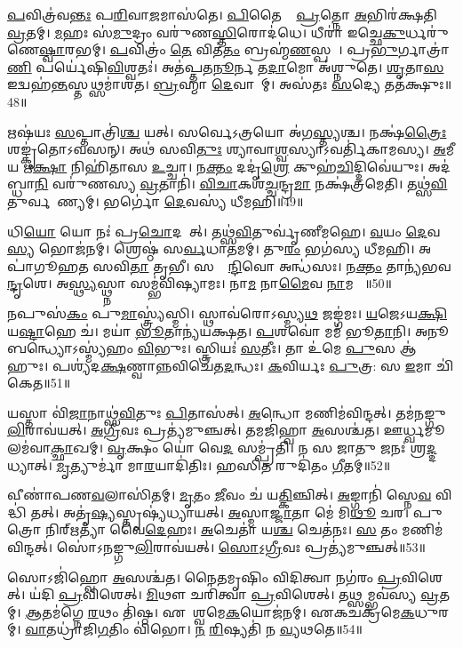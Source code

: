 \ul{𑌪}𑌵𑌿𑌤𑍍𑌰॑𑌵\ul{𑌨𑍍𑌤𑌃} 𑌪\ul{𑌰𑌿}𑌵𑌾\ul{𑌜}𑌮𑌾𑌸॑𑌤𑍇। \ul{𑌪𑌿}𑌤𑍈𑌷𑌾𑌂᳚ \ul{𑌪𑍍𑌰}𑌤𑍍𑌨𑍋 \ul{𑌅}𑌭𑌿𑌰॑𑌕𑍍𑌷𑌤𑌿 \ul{𑌵𑍍𑌰}𑌤𑌮𑍍‌। 
\ul{𑌮}𑌹𑌃 𑌸॑\ul{𑌮𑍁}𑌦𑍍𑌰𑌂 𑌵𑌰𑍁॑𑌣\ul{𑌸𑍍𑌤𑌿}𑌰𑍋𑌦॑𑌧𑍇। 𑌧𑍀𑌰𑌾॑ 𑌇𑌚𑍍𑌛𑍇\ul{𑌕𑍁}𑌰𑍍𑌧𑌰𑍁॑𑌣𑍇\ul{𑌷𑍍𑌵𑌾}𑌰𑌭𑌮𑍍‌᳚। 
\ul{𑌪}𑌵𑌿𑌤𑍍𑌰𑌂॑ \ul{𑌤𑍇} 𑌵𑌿𑌤॑\ul{𑌤𑌂} 𑌬𑍍𑌰𑌹𑍍𑌮॑\ul{𑌣}𑌸𑍍𑌪𑌤𑍇᳚। 𑌪𑍍𑌰\ul{𑌭𑍁}𑌰𑍍𑌗𑌾𑌤𑍍𑌰𑌾॑\ul{𑌣𑌿} 𑌪𑌰𑍍𑌯𑍇॑𑌷𑌿\ul{𑌵𑌿}𑌶𑍍𑌵𑌤𑌃॑। 
𑌅𑌤॑𑌪𑍍𑌤𑌤\ul{𑌨𑍂}𑌰𑍍𑌨 𑌤\ul{𑌦𑌾}𑌮𑍋 𑌅॑𑌶𑍍𑌨𑍁𑌤𑍇। \ul{𑌶𑍃}𑌤𑌾\ul{𑌸} 𑌇𑌦𑍍𑌵𑌹॑\ul{𑌨𑍍𑌤}𑌸𑍍𑌤𑌥𑍍𑌸𑌮𑌾॑𑌶𑌤। 
\ul{𑌬𑍍𑌰}𑌹𑍍𑌮𑌾 \ul{𑌦𑍇}𑌵𑌾𑌨𑌾᳚𑌮𑍍‌। 𑌅𑌸॑𑌤𑌃 \ul{𑌸}𑌦𑍍𑌯𑍇 𑌤𑌤॑𑌕𑍍𑌷𑍁𑌃॥48॥


𑌋𑌷॑𑌯𑌃 \ul{𑌸}𑌪𑍍𑌤𑌾𑌤𑍍𑌰𑌿॑\ul{𑌶𑍍𑌚} 𑌯𑌤𑍍‌। 𑌸𑌰𑍍𑌵𑍇𑌽𑌤𑍍𑌰𑌯𑍋 𑌅॑𑌗\ul{𑌸𑍍𑌤𑍍𑌯}𑌶𑍍𑌚। 
𑌨𑌕𑍍𑌷॑\ul{𑌤𑍍𑌰𑍈𑌃} 𑌶𑌙𑍍𑌕𑍃॑𑌤𑍋𑌽𑌵𑌸𑌨𑍍‌। 𑌅𑌥॑ 𑌸𑌵𑌿\ul{𑌤𑍁𑌃} 𑌶𑍍𑌯𑌾𑌵𑌾\ul{𑌶𑍍𑌵}𑌸𑍍𑌯𑌾𑌽𑌵𑌰𑍍𑌤𑌿॑𑌕𑌾𑌮𑌸𑍍𑌯। 
\ul{𑌅}𑌮𑍀 𑌯 𑌋\ul{𑌕𑍍𑌷𑌾} 𑌨𑌿𑌹𑌿॑𑌤𑌾𑌸 \ul{𑌉}𑌚𑍍𑌚𑌾। 𑌨\ul{𑌕𑍍𑌤𑌂} 𑌦𑌦𑍃॑\ul{𑌶𑍍𑌰𑍇} 𑌕𑍁𑌹॑\ul{𑌚𑌿}𑌦𑍍𑌦𑌿𑌵𑍇॑𑌯𑍁𑌃। 
𑌅𑌦॑𑌬𑍍𑌧𑌾\ul{𑌨𑌿} 𑌵𑌰𑍁॑𑌣𑌸𑍍𑌯 \ul{𑌵𑍍𑌰}𑌤𑌾𑌨𑌿॑। \ul{𑌵𑌿}\ul{𑌚𑌾}𑌕𑌶॑\ul{𑌚𑍍𑌚}𑌨𑍍𑌦𑍍𑌰\ul{𑌮𑌾} 𑌨𑌕𑍍𑌷॑𑌤𑍍𑌰𑌮𑍇𑌤𑌿। 
𑌤𑌥𑍍𑌸॑\ul{𑌵𑌿}𑌤𑍁𑌰𑍍𑌵𑌰𑍇᳚𑌣𑍍𑌯𑌮𑍍। 𑌭𑌰𑍍𑌗𑍋॑ \ul{𑌦𑍇}𑌵𑌸𑍍𑌯॑ 𑌧𑍀𑌮𑌹𑌿॥49॥


𑌧𑌿\ul{𑌯𑍋} 𑌯𑍋 𑌨𑌃॑ 𑌪𑍍𑌰\ul{𑌚𑍋}𑌦𑌯𑌾᳚𑌤𑍍‌। 𑌤𑌥𑍍𑌸॑\ul{𑌵𑌿}𑌤𑍁𑌰𑍍𑌵𑍃॑𑌣𑍀𑌮𑌹𑍇। 
\ul{𑌵}𑌯𑌂 \ul{𑌦𑍇}𑌵\ul{𑌸𑍍𑌯} 𑌭𑍋𑌜॑𑌨𑌮𑍍‌। 𑌶𑍍𑌰𑍇𑌷𑍍𑌠॑ 𑌸\ul{𑌰𑍍𑌵}𑌧𑌾𑌤॑𑌮𑌮𑍍‌। 
𑌤𑍁\ul{𑌰𑌂} 𑌭𑌗॑𑌸𑍍𑌯 𑌧𑍀𑌮𑌹𑌿। 𑌅𑌪𑌾॑𑌗𑍂𑌹𑌤 𑌸𑌵𑌿\ul{𑌤𑌾} 𑌤𑍃𑌭𑍀\sn। 
𑌸𑌰𑍍𑌵𑌾᳚\ul{𑌨𑍍𑌦𑌿}𑌵𑍋 𑌅𑌨𑍍𑌧॑𑌸𑌃। 𑌨\ul{𑌕𑍍𑌤𑌂} 𑌤𑌾𑌨𑍍𑌯॑\-𑌭𑌵\ul{𑌨𑍍𑌦𑍃}𑌶𑍇। 
𑌅\ul{𑌸𑍍𑌥𑍍𑌯}𑌸𑍍𑌥𑍍𑌨𑌾 𑌸𑌮𑍍𑌭॑𑌵𑌿𑌷𑍍𑌯𑌾𑌮𑌃। 𑌨𑌾\ul{𑌮} 𑌨𑌾\ul{𑌮𑍈}𑌵 \ul{𑌨𑌾}𑌮 𑌮𑍇᳚॥50॥


𑌨𑌪𑍁𑌸॑\ul{𑌕𑌂} 𑌪𑍁\ul{𑌮𑌾}\ul{}𑌸𑍍𑌤𑍍𑌰𑍍𑌯॑𑌸𑍍𑌮𑌿। 𑌸𑍍𑌥𑌾𑌵॑𑌰𑍋𑌽𑌸𑍍𑌮𑍍𑌯\ul{𑌥} 𑌜𑌙𑍍𑌗॑𑌮𑌃। 
\ul{𑌯}𑌜𑍇𑌽𑌯\ul{𑌕𑍍𑌷𑌿} 𑌯\ul{𑌷𑍍𑌟𑌾}𑌹𑍇 𑌚॑। 𑌮𑌯𑌾॑ \ul{𑌭𑍂}𑌤𑌾𑌨𑍍𑌯॑𑌯𑌕𑍍𑌷𑌤। 
\ul{𑌪}𑌶𑌵𑍋॑ 𑌮𑌮॑ 𑌭𑍂\ul{𑌤𑌾}𑌨𑌿। 𑌅𑌨𑍂𑌬𑌨𑍍𑌧𑍍𑌯𑍋𑌽𑌸𑍍𑌮𑍍𑌯॑𑌹𑌂 \ul{𑌵𑌿}𑌭𑍁𑌃। 
𑌸𑍍𑌤𑍍𑌰𑌿𑌯𑌃॑ \ul{𑌸}𑌤𑍀𑌃। 𑌤𑌾 𑌉॑𑌮𑍇 \ul{𑌪𑍁}\ul{}𑌸 𑌆॑𑌹𑍁𑌃। 
𑌪𑌶𑍍𑌯॑𑌦\ul{𑌕𑍍𑌷}𑌣𑍍𑌵𑌾𑌨𑍍𑌨𑌵𑌿𑌚𑍇॑𑌤\ul{𑌦}𑌨𑍍𑌧𑌃। \ul{𑌕}𑌵𑌿𑌰𑍍𑌯𑌃 \ul{𑌪𑍁}𑌤𑍍𑌰: 𑌸 \ul{𑌇}𑌮𑌾 𑌚𑌿॑𑌕𑍇𑌤॥51॥


𑌯𑌸𑍍𑌤𑌾 𑌵𑌿॑\ul{𑌜𑌾}𑌨𑌾𑌥𑍍𑌸॑\ul{𑌵𑌿}𑌤𑍁𑌃 \ul{𑌪𑌿}𑌤𑌾𑌸॑𑌤𑍍‌। \ul{𑌅}𑌨𑍍𑌧𑍋 𑌮𑌣𑌿𑌮॑𑌵𑌿𑌨𑍍𑌦𑌤𑍍‌। 
𑌤𑌮॑𑌨𑌙𑍍𑌗𑍁\ul{𑌲𑌿}𑌰𑌾𑌵॑𑌯𑌤𑍍‌। \ul{𑌅}\ul{𑌗𑍍𑌰𑍀}𑌵𑌃 𑌪𑍍𑌰𑌤𑍍𑌯॑𑌮𑍁𑌞𑍍𑌚𑌤𑍍‌। 
𑌤𑌮𑌜𑌿॑𑌹𑍍𑌵𑌾 \ul{𑌅}𑌸𑌶𑍍𑌚॑𑌤। 𑌊𑌰𑍍𑌧𑍍𑌵𑌮𑍂𑌲𑌮॑𑌵𑌾\ul{𑌕𑍍𑌛𑌾}𑌖𑌮𑍍‌। 
\ul{𑌵𑍃}𑌕𑍍𑌷𑌂 𑌯𑍋॑ 𑌵𑍇\ul{𑌦} 𑌸𑌮𑍍𑌪𑍍𑌰॑𑌤𑌿। 𑌨 𑌸 𑌜𑌾𑌤𑍁 𑌜𑌨𑌃॑ 𑌶𑍍𑌰\ul{𑌦𑍍𑌦}𑌧𑍍𑌯𑌾𑌤𑍍‌। 
\ul{𑌮𑍃}𑌤𑍍𑌯𑍁𑌰𑍍𑌮𑌾॑ 𑌮𑌾\ul{𑌰}𑌯𑌾𑌦𑌿॑𑌤𑌿𑌃। 𑌹𑌸𑌿𑌤 𑌰𑍁𑌦𑌿॑𑌤𑌂 \ul{𑌗𑍀}𑌤𑌮𑍍‌॥52॥


𑌵𑍀𑌣𑌾॑𑌪𑌣\ul{𑌵}𑌲𑌾𑌸𑌿॑𑌤𑌮𑍍‌। \ul{𑌮𑍃}𑌤𑌂 \ul{𑌜𑍀}𑌵𑌂 𑌚॑ 𑌯\ul{𑌤𑍍𑌕𑌿}𑌞𑍍𑌚𑌿𑌤𑍍। 
\ul{𑌅}𑌙𑍍𑌗𑌾𑌨𑌿॑ 𑌸𑍍𑌨𑍇\ul{𑌵} 𑌵𑌿𑌦𑍍𑌧𑌿॑ 𑌤𑌤𑍍‌। 𑌅𑌤𑍃॑\ul{𑌷𑍍𑌯}\ul{}𑌸𑍍𑌤𑍃𑌷𑍍𑌯॑𑌧𑍍𑌯𑌾𑌯𑌤𑍍‌। 
\ul{𑌅}𑌸𑍍𑌮𑌾\ul{𑌜𑍍𑌜𑌾}𑌤𑌾 𑌮𑍇॑ 𑌮𑌿\ul{𑌥𑍂} 𑌚𑌰\snn। 𑌪𑍁𑌤𑍍𑌰𑍋 𑌨𑌿𑌰𑍍‌𑌋𑌤𑍍𑌯𑌾॑ 𑌵𑍈\ul{𑌦𑍇}𑌹𑌃। 
\ul{𑌅}𑌚𑍇𑌤𑌾॑ 𑌯\ul{𑌶𑍍𑌚} 𑌚𑍇𑌤॑𑌨𑌃। \ul{𑌸} 𑌤𑌂 𑌮𑌣𑌿𑌮॑𑌵𑌿𑌨𑍍𑌦𑌤𑍍‌। 
𑌸𑍋॑𑌽𑌨𑌙𑍍𑌗𑍁\ul{𑌲𑌿}𑌰𑌾𑌵॑𑌯𑌤𑍍‌। \ul{𑌸𑍋}𑌽॒\ul{𑌗𑍍𑌰𑍀}𑌵𑌃 𑌪𑍍𑌰𑌤𑍍𑌯॑𑌮𑍁𑌞𑍍𑌚𑌤𑍍‌॥53॥


𑌸𑍋𑌽𑌜𑌿॑𑌹𑍍𑌵𑍋 \ul{𑌅}𑌸𑌶𑍍𑌚॑𑌤। 𑌨𑍈𑌤𑌮𑍃𑌷𑌿𑌂 𑌵𑌿𑌦𑌿𑌤𑍍𑌵𑌾 𑌨𑌗॑𑌰𑌂 \ul{𑌪𑍍𑌰}𑌵𑌿𑌶𑍇𑌤𑍍‌। 
𑌯॑𑌦𑌿 \ul{𑌪𑍍𑌰}𑌵𑌿𑌶𑍇𑌤𑍍‌। \ul{𑌮𑌿}𑌥𑍗 𑌚𑌰𑌿॑𑌤𑍍𑌵𑌾 \ul{𑌪𑍍𑌰}𑌵𑌿𑌶𑍇𑌤𑍍‌। 
𑌤𑌥𑍍𑌸𑌮𑍍𑌭𑌵॑𑌸𑍍𑌯 \ul{𑌵𑍍𑌰}𑌤𑌮𑍍‌। \ul{𑌆}𑌤𑌮॑𑌗𑍍𑌨𑍇 \ul{𑌰}𑌥𑌂 𑌤𑌿॑𑌷𑍍𑌠। 
𑌏𑌕𑌾᳚𑌶𑍍𑌵𑌮𑍇\ul{𑌕}𑌯𑍋𑌜॑𑌨𑌮𑍍‌। 𑌏𑌕𑌚𑌕𑍍𑌰॑𑌮𑍇\ul{𑌕}𑌧𑍁𑌰𑌮𑍍‌। 
\ul{𑌵𑌾}𑌤𑌧𑍍𑌰𑌾॑𑌜𑌿\ul{𑌗}𑌤𑌿𑌂 𑌵𑌿॑𑌭𑍋। \ul{𑌨} \ul{𑌰𑌿}𑌷𑍍𑌯𑌤𑌿॑ 𑌨 \ul{𑌵𑍍𑌯}𑌥𑌤𑍇॥54॥


